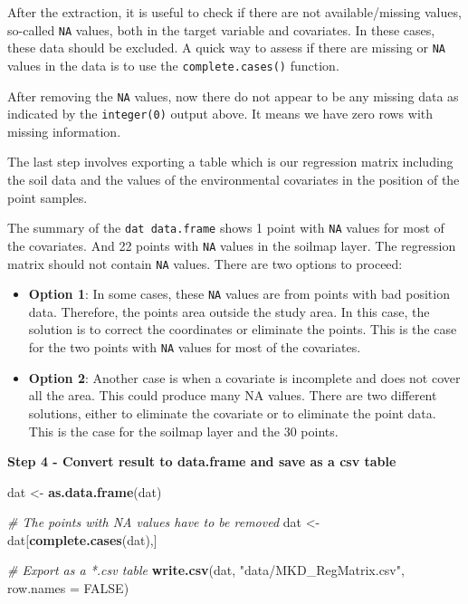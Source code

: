 \documentclass[10pt,b5paper,]{book}
\newenvironment{Shaded}{\begin{snugshade}}{\end{snugshade}}
\newcommand{\CommentTok}[1]{\textcolor[rgb]{0.56,0.35,0.01}{\textit{#1}}}
\newcommand{\DataTypeTok}[1]{\textcolor[rgb]{0.13,0.29,0.53}{#1}}
\newcommand{\KeywordTok}[1]{\textcolor[rgb]{0.13,0.29,0.53}{\textbf{#1}}}
\newcommand{\NormalTok}[1]{#1}
\newcommand{\OtherTok}[1]{\textcolor[rgb]{0.56,0.35,0.01}{#1}}
\newcommand{\StringTok}[1]{\textcolor[rgb]{0.31,0.60,0.02}{#1}}
\theoremstyle{definition}
\theoremstyle{definition}
\theoremstyle{definition}
\theoremstyle{remark}
\begin{document}
After the extraction, it is useful to check if there are not
available/missing values, so-called \texttt{NA} values, both in the
target variable and covariates. In these cases, these data should be
excluded. A quick way to assess if there are missing or \texttt{NA}
values in the data is to use the \texttt{complete.cases()} function.

After removing the \texttt{NA} values, now there do not appear to be any
missing data as indicated by the \texttt{integer(0)} output above. It
means we have zero rows with missing information.

The last step involves exporting a table which is our regression matrix
including the soil data and the values of the environmental covariates
in the position of the point samples.

The summary of the \texttt{dat\ data.frame} shows 1 point with
\texttt{NA} values for most of the covariates. And 22 points with
\texttt{NA} values in the soilmap layer. The regression matrix should
not contain \texttt{NA} values. There are two options to proceed:

\begin{itemize}
\item
  \textbf{Option 1}: In some cases, these \texttt{NA} values are from
  points with bad position data. Therefore, the points area outside the
  study area. In this case, the solution is to correct the coordinates
  or eliminate the points. This is the case for the two points with
  \texttt{NA} values for most of the covariates.
\item
  \textbf{Option 2}: Another case is when a covariate is incomplete and
  does not cover all the area. This could produce many NA values. There
  are two different solutions, either to eliminate the covariate or to
  eliminate the point data. This is the case for the soilmap layer and
  the 30 points.
\end{itemize}

\textbf{Step 4 - Convert result to data.frame and save as a csv table}

\begin{Shaded}
\begin{Highlighting}[]
\NormalTok{dat <-}\StringTok{ }\KeywordTok{as.data.frame}\NormalTok{(dat)}

\CommentTok{# The points with NA values have to be removed }
\NormalTok{dat <-}\StringTok{ }\NormalTok{dat[}\KeywordTok{complete.cases}\NormalTok{(dat),]}

\CommentTok{# Export as a *.csv table}
\KeywordTok{write.csv}\NormalTok{(dat, }\StringTok{"data/MKD_RegMatrix.csv"}\NormalTok{, }\DataTypeTok{row.names =} \OtherTok{FALSE}\NormalTok{)}
\end{Highlighting}
\end{Shaded}
\end{document}
